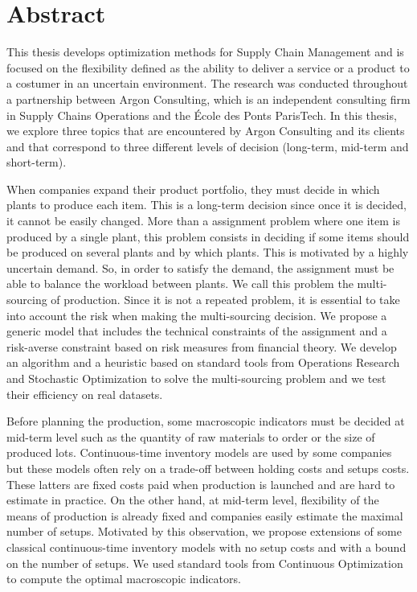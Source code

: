 \chapter*{Abstract} %
\label{cha:abstract}



This thesis develops optimization methods for Supply Chain Management and is focused on the flexibility defined as the ability to deliver a service or a product to a costumer in an uncertain environment.
The research was conducted throughout a partnership between Argon Consulting, which is an independent consulting firm in Supply Chains Operations and the \'Ecole des Ponts ParisTech.
In this thesis, we explore three topics that are encountered by Argon Consulting and its clients and that correspond to three different levels of decision (long-term, mid-term and short-term).


When companies expand their product portfolio, they must decide in which plants to produce each item.
This is a long-term decision since once it is decided, it cannot be easily changed.
More than a assignment problem where one item is produced by a single plant, this problem  consists in deciding if some items should be produced on several plants and by which plants.
This is motivated by a highly uncertain demand.
So, in order to satisfy the demand, the assignment must be able to balance the workload between plants.
We call this problem the multi-sourcing of production.
Since it is not a repeated problem, it is essential to take into account the risk when making the multi-sourcing decision.
We propose a generic model that includes the technical constraints of the assignment and a risk-averse constraint based on risk measures from financial theory.
We develop an algorithm and a heuristic based on standard tools from Operations Research and Stochastic Optimization to solve the multi-sourcing problem and we test their efficiency on real datasets.


Before planning the production, some macroscopic indicators must be decided at mid-term level such as the quantity of raw materials to order or the size of produced lots.
Continuous-time inventory models are used by some companies but these models often rely on a trade-off between holding costs and setups costs.
These latters are fixed costs paid when production is launched and are hard to estimate in practice.
On the other hand, at mid-term level, flexibility of the means of production is already fixed and companies easily estimate the maximal number of setups.
Motivated by this observation, we propose extensions of some classical continuous-time inventory models with no setup costs and with a bound on the number of setups.
We used standard tools from Continuous Optimization to compute the optimal macroscopic indicators.


